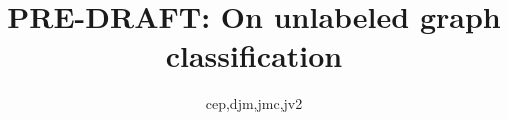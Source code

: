  
\usepackage{url}

\newcommand{\mcE}{\mathcal{E}}
\newcommand{\mcT}{\mathcal{T}}
\newcommand{\mcG}{\mathcal{G}}
\newcommand{\mcM}{\mathcal{M}}
\newcommand{\mcL}{\mathcal{L}}
\newcommand{\hatmcE}{\widehat{\mcE}}
\newcommand{\hatp}{\widehat{p}}
\newcommand{\hatP}{\widehat{P}}
\newcommand{\hatQ}{\widehat{Q}}
\newcommand{\hatL}{\widehat{L}}
\newcommand{\mhP}{\widehat{\PP}}
\newcommand{\tildeA}{\widetilde{A}}

\newcommand{\defa}{\begin{defi}}
\newcommand{\defb}{\end{defi}}

\newtheorem{Rem}{Remark}%
\newtheorem{Alg}{Algorithm}%
\newtheorem{Thm}{Theorem}[section]
\newtheorem{Lem}{Lemma}[section]
\newtheorem{Def}{Definition}[section]

\title{PRE-DRAFT: On unlabeled graph classification}

\author{cep,djm,jmc,jv2}



